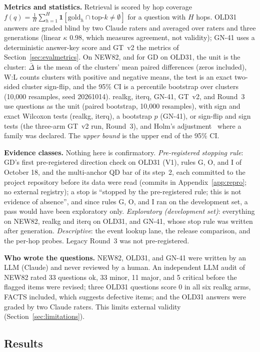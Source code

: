 \textbf{Metrics and statistics.} Retrieval is scored by hop coverage
$f(q)=\frac{1}{H}\sum_{h=1}^{H}\mathbf{1}[\mathrm{gold}_h\cap
\mathrm{top}\text{-}k\neq\emptyset]$ for a question with $H$ hops. OLD31
answers are graded blind by two Claude raters and averaged over raters
and three generations (linear $\kappa$ 0.98, which measures agreement,
not validity); GN-41 uses a deterministic answer-key score and GT~v2 the
metrics of Section~\ref{sec:evalmetrics}. On NEW82, and for GD on OLD31,
the unit is the cluster: $\bar{\Delta}$ is the mean of the clusters' mean
paired differences (zeros included), W:L counts clusters with positive
and negative means, the test is an exact two-sided cluster sign-flip, and
the 95\% CI is a percentile bootstrap over clusters (10{,}000 resamples,
seed 20261014). realkg, iterq, GN-41, GT~v2, and Round~3 use questions
as the unit (paired bootstrap, 10{,}000 resamples), with sign and exact
Wilcoxon tests (realkg, iterq), a bootstrap $p$ (GN-41), or sign-flip and sign tests (the three-arm GT~v2 run, Round~3), and Holm's adjustment~\cite{holm1979} where
a family was declared. The \emph{upper bound} is the upper end of the 95\% CI.

\textbf{Evidence classes.} Nothing here is confirmatory. \emph{Pre-registered
stopping rule}: GD's first pre-registered direction check on OLD31 (V1),
rules G, O, and I of October 18, and the multi-anchor QD bar of its
step~2, each committed to the project repository before its data were
read (commits in Appendix~\ref{app:repro}; no external registry); a stop
is ``stopped by the pre-registered rule; this is not
evidence of absence'', and since rules G, O, and I ran on the development
set, a pass would have been exploratory only. \emph{Exploratory
(development set)}: everything on NEW82, realkg and iterq on OLD31, and
GN-41, whose stop rule was written after generation. \emph{Descriptive}:
the event lookup lane, the release comparison, and the per-hop probes.
Legacy Round~3 was not pre-registered.

\textbf{Who wrote the questions.} NEW82, OLD31, and GN-41 were written by
an LLM (Claude) and never reviewed by a human. An independent LLM audit
of NEW82 rated 33 questions ok, 33 minor, 11 major, and 5 critical before
the flagged items were revised; three
OLD31 questions score 0 in all six realkg arms, FACTS included, which
suggests defective items; and the OLD31 answers were graded by two Claude
raters. This limits external validity (Section~\ref{sec:limitations}).

\subsection{Results}
\label{sec:rebuiltresults}

